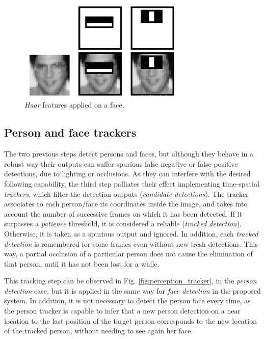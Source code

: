 \begin{figure}[h]
	\centering
	\includegraphics[width=8cm]{images/haar_on_face}
	\caption{\emph{Haar} features applied on a face.}
	\label{fig:perception_haar}
\end{figure}


\subsection{Person and face trackers}

The two previous steps detect persons and faces, but although they behave in a robust way their outputs can suffer spurious false negative or false positive detections, due to lighting or occlusions. As they can interfere with the desired following capability, the third step palliates their effect implementing time-spatial \emph{trackers}, which filter the detection outputs (\emph{candidate detections}). The tracker associates to each person/face its coordinates inside the image, and takes into account the number of successive frames on which it has been detected. If it surpasses a \emph{patience} threshold, it is considered a reliable (\emph{tracked detection}). Otherwise, it is taken as a spurious output and ignored. In addition, each \emph{tracked detection} is remembered for some frames even without new fresh detections. This way, a partial occlusion of a particular person does not cause the elimination of that person, until it has not been lost for a while.

This tracking step can be observed in Fig. \ref{fig:perception_tracker}, in the \emph{person detection} case, but it is applied in the same way for \emph{face detection} in the proposed system. In addition, it is not necessary to detect the person face every time, as the person tracker is capable to infer that a new person detection on a near location to the last position of the target person corresponds to the new location of the tracked person, without needing to see again her face.


